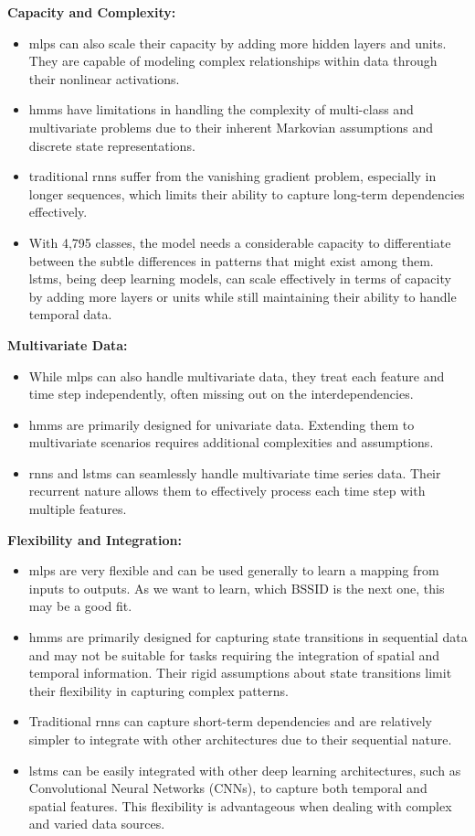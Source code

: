 \textbf{Capacity and Complexity:}
\begin{itemize}
    \item \acp{mlp} can also scale their capacity by adding more hidden layers and units. They are capable of modeling complex relationships within data through their nonlinear activations.
    \item \acp{hmm} have limitations in handling the complexity of multi-class and multivariate problems due to their inherent Markovian assumptions and discrete state representations.
    \item traditional \acp{rnn} suffer from the vanishing gradient problem, especially in longer sequences, which limits their ability to capture long-term dependencies effectively. \cite{rnn_difficulties_2013}
    \item With 4,795 classes, the model needs a considerable capacity to differentiate between the subtle differences in patterns that might exist among them. \acp{lstm}, being deep learning models, can scale effectively in terms of capacity by adding more layers or units while still maintaining their ability to handle temporal data.
\end{itemize}

\textbf{Multivariate Data:}
\begin{itemize}
    \item While \acp{mlp} can also handle multivariate data, they treat each feature and time step independently, often missing out on the interdependencies.
    \item \acp{hmm} are primarily designed for univariate data. Extending them to multivariate scenarios requires additional complexities and assumptions.
    \item \acp{rnn} and \acp{lstm} can seamlessly handle multivariate time series data. Their recurrent nature allows them to effectively process each time step with multiple features.
\end{itemize}

\textbf{Flexibility and Integration:}
\begin{itemize}
    \item \acp{mlp} are very flexible and can be used generally to learn a mapping from inputs to outputs. \cite{mlp-vs-cnn-vs-rnn} As we want to learn, which BSSID is the next one, this may be a good fit.
    \item \acp{hmm} are primarily designed for capturing state transitions in sequential data and may not be suitable for tasks requiring the integration of spatial and temporal information. Their rigid assumptions about state transitions limit their flexibility in capturing complex patterns. \cite{hmm-rabiner-1989}
    \item Traditional \acp{rnn} can capture short-term dependencies and are relatively simpler to integrate with other architectures due to their sequential nature.
    \item \acp{lstm} can be easily integrated with other deep learning architectures, such as Convolutional Neural Networks (CNNs), to capture both temporal and spatial features. This flexibility is advantageous when dealing with complex and varied data sources.
\end{itemize}

